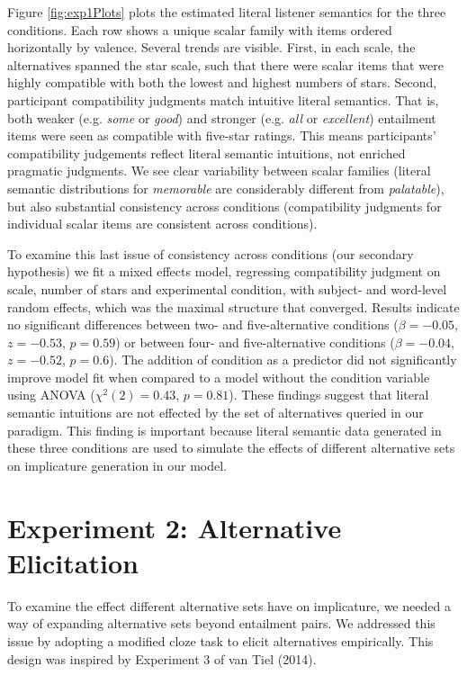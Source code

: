 \documentclass[10pt, letterpaper]{article}
\begin{document}
Figure \ref{fig:exp1Plots} plots the estimated literal listener
semantics for the three conditions. Each row shows a unique scalar
family with items ordered horizontally by valence. Several trends are
visible. First, in each scale, the alternatives spanned the star scale,
such that there were scalar items that were highly compatible with both
the lowest and highest numbers of stars. Second, participant
compatibility judgments match intuitive literal semantics. That is, both
weaker (e.g. \emph{some} or \emph{good}) and stronger (e.g. \emph{all}
or \emph{excellent}) entailment items were seen as compatible with
five-star ratings. This means participants' compatibility judgements
reflect literal semantic intuitions, not enriched pragmatic judgments.
We see clear variability between scalar families (literal semantic
distributions for \emph{memorable} are considerably different from
\emph{palatable}), but also substantial consistency across conditions
(compatibility judgments for individual scalar items are consistent
across conditions).

To examine this last issue of consistency across conditions (our
secondary hypothesis) we fit a mixed effects model, regressing
compatibility judgment on scale, number of stars and experimental
condition, with subject- and word-level random effects, which was the
maximal structure that converged. Results indicate no significant
differences between two- and five-alternative conditions
(\(\beta=-0.05\), \(z = -0.53\), \(p = 0.59\)) or between four- and
five-alternative conditions (\(\beta = -0.04\), \(z = -0.52\),
\(p = 0.6\)). The addition of condition as a predictor did not
significantly improve model fit when compared to a model without the
condition variable using ANOVA (\(\chi^2(2) = 0.43\), \(p = 0.81\)).
These findings suggest that literal semantic intuitions are not effected
by the set of alternatives queried in our paradigm. This finding is
important because literal semantic data generated in these three
conditions are used to simulate the effects of different alternative
sets on implicature generation in our model.

\section{Experiment 2: Alternative
Elicitation}\label{experiment-2-alternative-elicitation}

To examine the effect different alternative sets have on implicature, we
needed a way of expanding alternative sets beyond entailment pairs. We
addressed this issue by adopting a modified cloze task to elicit
alternatives empirically. This design was inspired by Experiment 3 of
{van Tiel} (2014).
\end{document}
